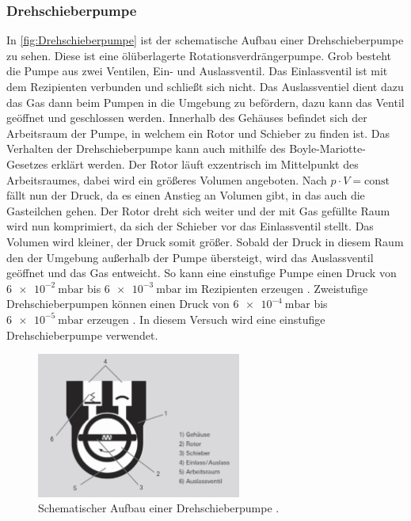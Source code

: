         \subsubsection{Drehschieberpumpe}
            In \autoref{fig:Drehschieberpumpe} ist der schematische Aufbau einer Drehschieberpumpe zu sehen.
            Diese ist eine ölüberlagerte Rotationsverdrängerpumpe.
            Grob besteht die Pumpe aus zwei Ventilen, Ein- und Auslassventil.
            Das Einlassventil ist mit dem Rezipienten verbunden und schließt sich nicht.
            Das Auslassventiel dient dazu das Gas dann beim Pumpen in die Umgebung zu befördern, dazu kann das Ventil geöffnet und geschlossen werden.
            Innerhalb des Gehäuses befindet sich der Arbeitsraum der Pumpe, in welchem ein Rotor und Schieber zu finden ist.
            Das Verhalten der Drehschieberpumpe kann auch mithilfe des Boyle-Mariotte-Gesetzes erklärt werden.
            Der Rotor läuft exzentrisch im Mittelpunkt des Arbeitsraumes, dabei wird ein größeres Volumen angeboten.
            Nach $p \cdot V = \text{const}$ fällt nun der Druck, da es einen Anstieg an Volumen gibt, in das auch die Gasteilchen gehen.
            Der Rotor dreht sich weiter und der mit Gas gefüllte Raum wird nun komprimiert, da sich der Schieber vor das Einlassventil stellt.
            Das Volumen wird kleiner, der Druck somit größer.
            Sobald der Druck in diesem Raum den der Umgebung außerhalb der Pumpe übersteigt, wird das Auslassventil geöffnet und das Gas entweicht.
            So kann eine einstufige Pumpe einen Druck von $\SI{6e-2}{\milli\bar}$ bis $\SI{6e-3}{\milli\bar}$ im Rezipienten erzeugen \cite{VakuumBuch}.
            Zweistufige Drehschieberpumpen können einen Druck von $\SI{6e-4}{\milli\bar}$ bis $\SI{6e-5}{\milli\bar}$ erzeugen \cite{VakuumBuch}.
            In diesem Versuch wird eine einstufige Drehschieberpumpe verwendet.
      
        \begin{figure}[H]
            \centering
            \includegraphics[width=0.6\textwidth]{bilder/Drehschieberpumpe.png}
            \caption{Schematischer Aufbau einer Drehschieberpumpe \cite{Pfeiffer}.}
            \label{fig:Drehschieberpumpe}
        \end{figure}

